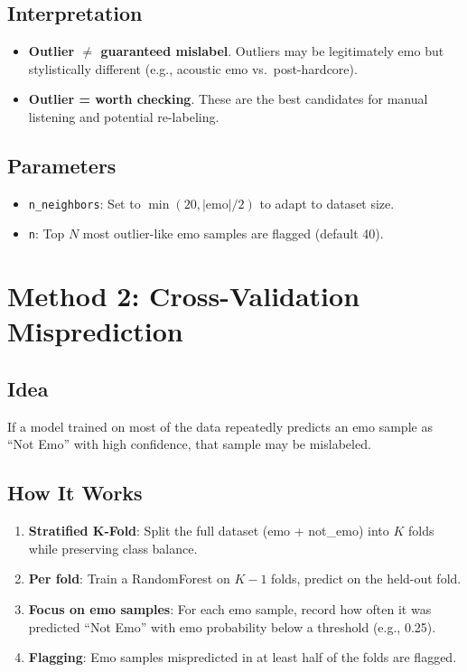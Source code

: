 \documentclass[11pt,a4paper]{article}
\begin{document}
\subsection{Interpretation}

\begin{itemize}
  \item \textbf{Outlier \(\neq\) guaranteed mislabel}. Outliers may be legitimately emo but stylistically different (e.g., acoustic emo vs.\ post-hardcore).
  \item \textbf{Outlier = worth checking}. These are the best candidates for manual listening and potential re-labeling.
\end{itemize}

\subsection{Parameters}

\begin{itemize}
  \item \texttt{n\_neighbors}: Set to \(\min(20, \lvert \text{emo} \rvert / 2)\) to adapt to dataset size.
  \item \texttt{n}: Top \(N\) most outlier-like emo samples are flagged (default 40).
\end{itemize}

\section{Method 2: Cross-Validation Misprediction}

\subsection{Idea}

If a model trained on most of the data repeatedly predicts an emo sample as ``Not Emo'' with high confidence, that sample may be mislabeled.

\subsection{How It Works}

\begin{enumerate}
  \item \textbf{Stratified K-Fold}: Split the full dataset (emo + not\_emo) into \(K\) folds while preserving class balance.
  \item \textbf{Per fold}: Train a RandomForest on \(K-1\) folds, predict on the held-out fold.
  \item \textbf{Focus on emo samples}: For each emo sample, record how often it was predicted ``Not Emo'' with emo probability below a threshold (e.g., 0.25).
  \item \textbf{Flagging}: Emo samples mispredicted in at least half of the folds are flagged.
\end{enumerate}
\end{document}
